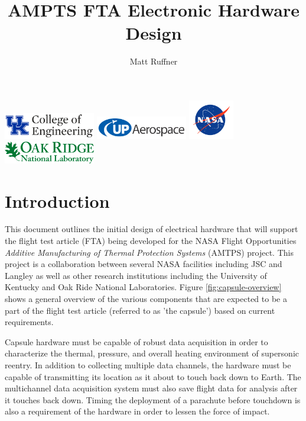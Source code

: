\documentclass{article}
\title{AMPTS FTA Electronic Hardware Design}
\author{Matt Ruffner}
\date
\begin{document}
\maketitle
\begin{center}
	\includegraphics[width=4cm]{images/ukcoe.png}
	\includegraphics[width=4cm]{images/upaero-logo.png}
	\includegraphics[width=2cm]{images/nasa-logo.png}
	\includegraphics[width=4cm]{images/ornl.pdf}	
\end{center}
\tableofcontents \newpage
\listoffigures 
\listoftables \newpage



\section{Introduction}
This document outlines the initial design of electrical hardware that will support the flight test article (FTA) being developed for the NASA Flight Opportunities \textit{Additive Manufacturing of Thermal Protection Systems} (AMTPS) project. This project is a collaboration between several NASA facilities including JSC and Langley as well as other research institutions including the University of Kentucky and Oak Ride National Laboratories. Figure \ref{fig:capsule-overview} shows a general overview of the various components that are  expected to be a part of the flight test article (referred to as 'the capsule') based on current requirements.

Capsule hardware must be capable of robust data acquisition in order to characterize the thermal, pressure, and overall heating environment of supersonic reentry. In addition to collecting multiple data channels, the hardware must be capable of transmitting its location as it about to touch back down to Earth. The multichannel data acquisition system must also save flight data for analysis after it touches back down. Timing the deployment of a parachute before touchdown is also a requirement of the hardware in order to lessen the force of impact.
\end{document}
